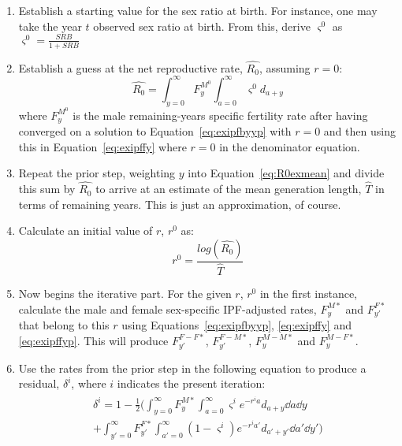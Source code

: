 \begin{enumerate}
  \item Establish a starting value for the sex ratio at birth. For instance, one
  may take the year $t$ observed sex ratio at birth. From this, derive
  $\varsigma^0$ as $\varsigma^0 = \frac{SRB}{1+SRB}$
  \item Establish a guess at the net reproductive rate, $\widehat{R_0}$,
  assuming $r = 0$:
  \begin{equation}
  \label{eq:R0exipf0}
  \widehat{R_0} = \int _{y=0}^\infty F_{y}^{M^0} \int_{a=0}^\infty \varsigma^0
  d_{a+y}
  \end{equation}
  where $F_{y}^{M^0}$ is the male remaining-years specific fertility rate after
  having converged on a solution to Equation~\eqref{eq:exipfbyyp} with $r=0$ and
  then using this in Equation~\ref{eq:exipffy} where $r=0$ in the denominator
  equation.
  \item Repeat the prior step, weighting $y$ into
  Equation~\eqref{eq:R0exmean} and divide this sum by $\widehat{R_0}$ to arrive at 
  an estimate of the mean generation length, $\widehat{T}$ in terms of remaining
  years. This is just an approximation, of course.
  \item Calculate an initial value of $r$, $r^0$ as:
  \begin{equation}
  r^0 = \frac{log(\widehat{R_0})}{\widehat{T}}
  \end{equation}
  \item Now begins the iterative part. For the given $r$, $r^0$ in the first
  instance, calculate the male and female sex-specific IPF-adjusted rates,
  $F_{y}^{M\ast}$ and $F_{y'}^{F\ast}$ that belong to this $r$ using
  Equations~\eqref{eq:exipfbyyp}, \eqref{eq:exipffy} and
  \eqref{eq:exipffyp}. This will produce
  $F_{y'}^{F-F\ast}$, $F_{y'}^{F-M\ast}$, $F_{y}^{M-M\ast}$ and
  $F_{y}^{M-F\ast}$.
  \item Use the rates from the prior step in the following equation to produce a
  residual, $\delta^i$, where $i$ indicates the present iteration:
  \begin{align}
  \label{eq:exipfroptimugly}
  \begin{split}
  \delta^i = 1 - \frac{1}{2}\Bigg( \int _{y=0}^\infty F_{y}^{M\ast}
  \int_{a=0}^\infty \varsigma^i e^{-r^ia}d_{a+y} \dd a \dd y \\
  + \int _{y'=0}^\infty F_{y'}^{F\ast} \int_{a'=0}^\infty
(1-\varsigma^i) e^{-r^ia'}d_{a'+y'} \dd a' \dd y'\Bigg)
\end{split}
  \end{align}

\end{enumerate}
